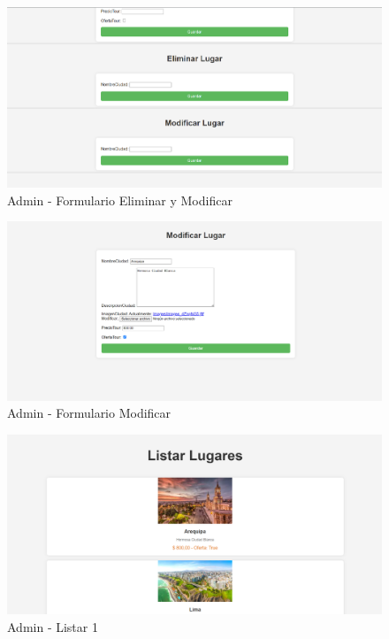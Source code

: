 \documentclass{article}
\begin{document}
  \begin{figure}[H]
    \centering
    \includegraphics[width=1\textwidth, keepaspectratio]{img/ejecucion7.png}
    \caption{Admin - Formulario Eliminar y Modificar}
  \end{figure}
  \newpage
  \begin{figure}[H]
    \centering
    \includegraphics[width=1\textwidth, keepaspectratio]{img/ejecucion10.png}
    \caption{Admin - Formulario Modificar}
  \end{figure}
  \begin{figure}[H]
    \centering
    \includegraphics[width=1\textwidth, keepaspectratio]{img/ejecucion8.png}
    \caption{Admin - Listar 1}
  \end{figure}
\end{document}
